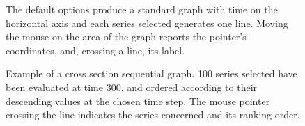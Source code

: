 \documentclass [11pt,a4paper] {book}
\begin{document}
\begin{figure}[ht]
  \centering
  \caption{\small The default options produce a standard graph with time on the horizontal axis and each series selected generates one line. Moving the mouse on the area of the graph reports the pointer's coordinates, and, crossing a line, its label.}
  \label{example_graph}
\end{figure}

\begin{figure}[ht]
  \centering
  \caption{\small Example of a cross section sequential graph. 100 series selected have been evaluated at time 300, and ordered according to their descending values at the chosen time step. The mouse pointer crossing the line indicates the series concerned and its ranking order.}
  \label{fig:cross_section}
\end{figure}
\end{document}
